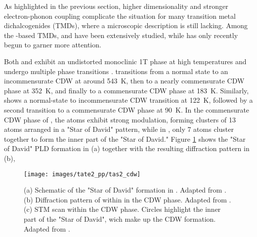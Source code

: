 As highlighted in the previous section, higher dimensionality and stronger electron-phonon coupling complicate the situation for many transition metal dichalcogenides (TMDs), where a microscopic description is still lacking.
Among the -based TMDs,  and  have been extensively studied, while  has only recently begun to garner more attention.

Both  and  exhibit an undistorted monoclinic 1T phase at high temperatures and undergo multiple phase transitions \cite{pouget_structural_2024,lin_evidence_2022}.
 transitions from a normal state to an incommensurate CDW at around \qty{543}{\kelvin}, then to a nearly commensurate CDW phase at \qty{352}{\kelvin}, and finally to a commensurate CDW phase at \qty{183}{\kelvin}.
Similarly,  shows a normal-state to incommensurate CDW transition at \qty{122}{\kelvin}, followed by a second transition to a commensurate CDW phase at \qty{90}{\kelvin}.
In the commensurate CDW phase of , the  atoms exhibit strong modulation, forming clusters of 13 atoms arranged in a "Star of David" pattern, while in , only 7 atoms cluster together to form the inner part of the "Star of David."
Figure \ref{fig:tas2_cdw} shows the "Star of David" PLD formation in (a) together with the resulting diffraction pattern in (b),

\begin{figure}
	\centering
	\texttt{[image: images/tate2\_pp/tas2\_cdw]}
	\caption{(a) Schematic of the "Star of David" formation in . Adapted from \cite{maklar_coherent_2023}. (b) Diffraction pattern of  within in the CDW phase. Adapted from \cite{han_exploration_2015}. (c) STM scan within the  CDW phase. Circles highlight the inner part of the "Star of David", wich make up the CDW formation. Adapted from \cite{feng_charge_2016}.}
	\label{fig:tas2_cdw}
\end{figure}


